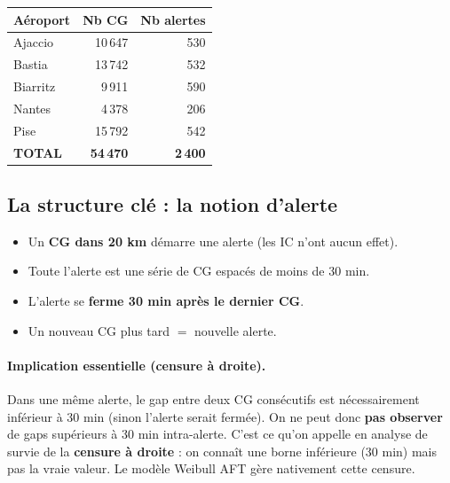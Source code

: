 \documentclass[11pt,a4paper]{article}
\begin{document}
\begin{table}[H]
\centering
\begin{tabular}{lrr}
\toprule
\textbf{Aéroport} & \textbf{Nb CG} & \textbf{Nb alertes} \\
\midrule
Ajaccio  & 10\,647 & 530 \\
Bastia   & 13\,742 & 532 \\
Biarritz &  9\,911 & 590 \\
Nantes   &  4\,378 & 206 \\
Pise     & 15\,792 & 542 \\
\midrule
\textbf{TOTAL} & \textbf{54\,470} & \textbf{2\,400} \\
\bottomrule
\end{tabular}
\end{table}

\subsection{La structure clé : la notion d'alerte}

\begin{tcolorbox}[colback=orange!5,colframe=orange!60!black,title=\textbf{Définition d'une alerte Météorage}]
\begin{itemize}[topsep=2pt]
    \item Un \textbf{CG dans 20 km} démarre une alerte (les IC n'ont aucun effet).
    \item Toute l'alerte est une série de CG espacés de moins de 30 min.
    \item L'alerte se \textbf{ferme 30 min après le dernier CG}.
    \item Un nouveau CG plus tard $=$ nouvelle alerte.
\end{itemize}
\end{tcolorbox}

\paragraph{Implication essentielle (censure à droite).}
Dans une même alerte, le gap entre deux CG consécutifs est nécessairement inférieur à 30 min
(sinon l'alerte serait fermée). On ne peut donc \textbf{pas observer} de gaps supérieurs à
30 min intra-alerte. C'est ce qu'on appelle en analyse de survie de la \textbf{censure à
droite} : on connaît une borne inférieure (30 min) mais pas la vraie valeur. Le modèle
Weibull AFT gère nativement cette censure.

\end{document}
